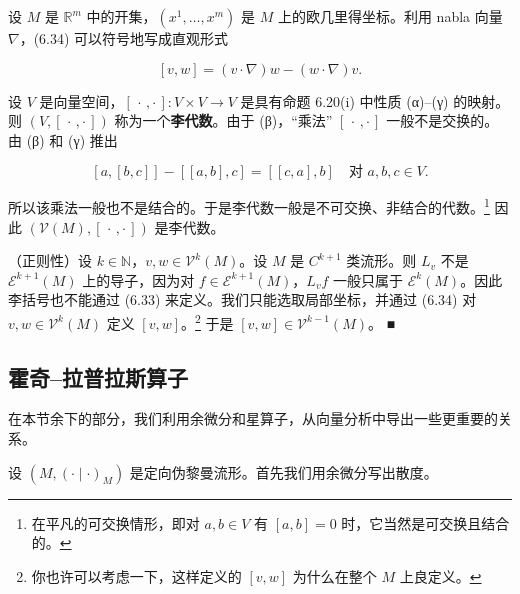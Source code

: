 \begin{remark}

\begin{items}
\item

设 $ M $ 是 $ \mathbb{R}^{m} $ 中的开集，$ (x^{1},\ldots,x^{m}) $ 是 $ M $ 上的欧几里得坐标。利用 nabla 向量 $ \nabla $，(6.34) 可以符号地写成直观形式

\[
[v,w] = (v\cdot\nabla)w - (w\cdot\nabla)v .
\]
\item

设 $ V $ 是向量空间，$ [\,\cdot\,,\cdot\,] : V\times V \to V $ 是具有命题 6.20(i) 中性质 (α)–(γ) 的映射。则 $ (V,[\,\cdot\,,\cdot\,]) $ 称为一个\textbf{李代数}。由于 (β)，“乘法” $ [\,\cdot\,,\cdot\,] $ 一般不是交换的。由 (β) 和 (γ) 推出

\[
[a,[b,c]] - [[a,b],c] = [[c,a],b] \quad \text{对 } a, b, c \in V .
\]

所以该乘法一般也不是结合的。于是李代数一般是不可交换、非结合的代数。\footnote{在平凡的可交换情形，即对 $ a, b \in V $ 有 $ [a,b] = 0 $ 时，它当然是可交换且结合的。} 因此 $ (\mathcal{V}(M),[\,\cdot\,,\cdot\,]) $ 是李代数。

\item

（正则性）设 $ k \in \mathbb{N} $，$ v, w \in \mathcal{V}^{k}(M) $。设 $ M $ 是 $ C^{k+1} $ 类流形。则 $ L_{v} $ 不是 $ \mathcal{E}^{k+1}(M) $ 上的导子，因为对 $ f \in \mathcal{E}^{k+1}(M) $，$ L_{v}f $ 一般只属于 $ \mathcal{E}^{k}(M) $。因此李括号也不能通过 (6.33) 来定义。我们只能选取局部坐标，并通过 (6.34) 对 $ v, w \in \mathcal{V}^{k}(M) $ 定义 $ [v,w] $。\footnote{你也许可以考虑一下，这样定义的 $ [v,w] $ 为什么在整个 $ M $ 上良定义。} 于是 $ [v,w] \in \mathcal{V}^{k-1}(M) $。 \nobreak\hspace{0.35em}■

\end{items}

\end{remark}

\subsection*{霍奇–拉普拉斯算子}

在本节余下的部分，我们利用余微分和星算子，从向量分析中导出一些更重要的关系。

设 $ (M,(\cdot\mid\cdot)_{M}) $ 是定向伪黎曼流形。首先我们用余微分写出散度。

